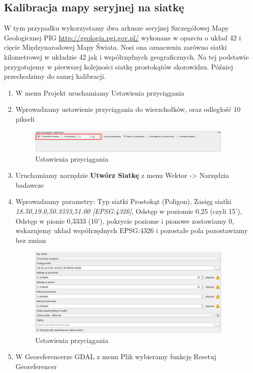\documentclass[a4paper,11pt, onecolumn, openany]{memoir}
\begin{document}
    \subsection{Kalibracja mapy seryjnej na siatkę}
W tym przypadku wykorzystamy dwa arkusze seryjnej Szczegółowej Mapy Geologicznej PIG \hyperlink{http://geologia.pgi.gov.pl/}{http://geologia.pgi.gov.pl/} wykonane w oparciu o układ 42 i cięcie Międzynarodowej Mapy Świata. Nosi ona oznaczenia zarówno siatki kilometrowej w układzie 42 jak i współrzędnych geograficznych. Na tej podstawie przygotujemy w pierwszej kolejności siatkę prostokątów skorowidzu. Później przechodzimy do samej kalibracji. 
		\begin{enumerate}
		\item W menu Projekt uruchamiamy Ustawienia przyciągania
		\item Wprowadzamy ustawienie przyciągania do wierzchołków, oraz odległość 10 pikseli
		\begin{figure}[!ht]
			\centering
			\includegraphics[width=10cm]{georef-przyciaganie}
			\caption{Ustawienia przyciągania}
		\end{figure}
		\item Uruchamiamy narzędzie \textbf{Utwórz Siatkę} z menu Wektor -> Narzędzia badawcze
		\item Wprowadzamy parametry: Typ siatki Prostokąt (Poligon), Zasięg siatki \emph{18.50,19.0,50.3333,51.00 [EPSG:4326]}, Odstęp w poziomie 0,25  (czyli 15'), Odstęp w pionie 0,3333 (10'), pokrycie poziome i pionowe zostawiamy 0, wskazujemy układ współrzędnych EPSG:4326 i pozostałe pola pozostawiamy bez zmian
		\begin{figure}[!ht]
	\centering
	\includegraphics[width=10cm]{georef-siatka}
	\caption{Ustawienia przyciągania}
\end{figure}		
		\item W Georeferencerze GDAL z menu Plik wybieramy funkcję Resetuj Georeferencer

\end{enumerate}
\end{document}
